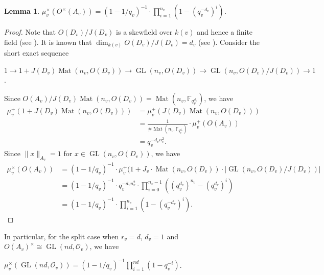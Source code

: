 \documentclass[11pt]{article}
\theoremstyle{plain}
\newtheorem{lemma}[theorem]{Lemma}
\theoremstyle{remark}
\theoremstyle{definition}
\DeclareMathOperator{\GL}{GL}
\DeclareMathOperator{\Mt}{Mat}
\begin{document}
\begin{lemma}\label{lvolmaxorder}
$\mu^{\times}_v(O^{\times}(A_v))=(1-1/q_v)^{-1}\cdot \prod_{i=1}^{n_v}(1-(q_v^{-d_v})^i)$. 
\end{lemma}
\begin{proof}
Note that $O(D_v)/J(D_v)$ is a skewfield over $k(v)$ and hence a finite field (see \cite[Theorem 13.2 and Theorem 7.24]{Rei03}).
It is known that $\dim_{k(v)}O(D_v)/J(D_v)=d_v$ (see \cite[Theorem 14.3]{Rei03}). 
Consider the short exact sequence
\begin{center}
    $1\to 1+J(D_v)\Mt(n_v,O(D_v))\to \GL(n_v,O(D_v))\to \GL(n_v,O(D_v)/J(D_v))\to 1$. 
\end{center}
Since $O(A_v)/J(D_v)\Mt(n_v,O(D_v))=\Mt(n_v,\mathbb{F}_{q_{v}^{d_v}})$, 
we have
\begin{equation*}
\begin{aligned}
    \mu^+_{v}(1+J(D_v)\Mt(n_v,O(D_v)))&=\mu^+_{v}(J(D_v)\Mt(n_v,O(D_v)))\\
    &=\frac{1}{\# \Mt(n_v,\mathbb{F}_{q_{v}^{d_v}})}\cdot \mu^{+}_v(O(A_v))\\
    &=q_v^{-d_v n_v^2}. 
\end{aligned}
\end{equation*}
Since $\|x\|_{A_v}=1$ for $x\in \GL(n_v,O(D_v))$, we have
\begin{equation*}
\begin{aligned}
\mu^{\times}_v(O(A_v))&=(1-1/q_v)^{-1}\cdot \mu^{+}_v(1+J_v\cdot \Mt(n_v,O(D_v))\cdot |\GL(n_v,O(D_v)/J(D_v))| \\
&=(1-1/q_v)^{-1}\cdot q_v^{-d_v n_v^2}\cdot \prod_{i=0}^{n_v-1}((q_v^{d_v})^{n_v}-(q_v^{d_v})^i)\\
&=(1-1/q_v)^{-1}\cdot \prod_{i=1}^{n_v}(1-(q_v^{-d_v})^i). 
\end{aligned}
\end{equation*}
\end{proof}

In particular, for the split case when $r_v=d$, $d_v=1$ and $O(A_v)^{\times}\cong \GL(nd,\mathcal{O}_v)$, we have
\begin{center}
 $\mu^{\times}_v(\GL(nd,\mathcal{O}_v))=(1-1/q_v)^{-1}\prod_{i=1}^{nd}(1-q_v^{-i})$.    
\end{center}
\end{document}
